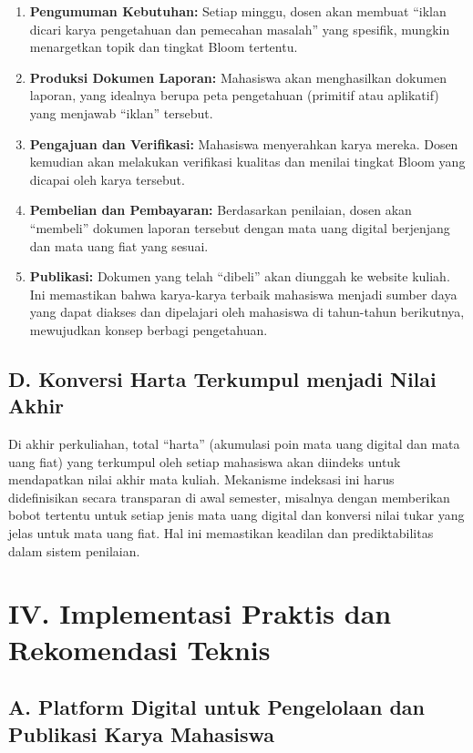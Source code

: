 \documentclass[
  letterpaper,
  DIV=11,
  numbers=noendperiod]{scrreprt}
\begin{document}
\begin{enumerate}
\def\labelenumi{\arabic{enumi}.}
\item
  \textbf{Pengumuman Kebutuhan:} Setiap minggu, dosen akan membuat
  ``iklan dicari karya pengetahuan dan pemecahan masalah'' yang
  spesifik, mungkin menargetkan topik dan tingkat Bloom tertentu.
\item
  \textbf{Produksi Dokumen Laporan:} Mahasiswa akan menghasilkan dokumen
  laporan, yang idealnya berupa peta pengetahuan (primitif atau
  aplikatif) yang menjawab ``iklan'' tersebut.
\item
  \textbf{Pengajuan dan Verifikasi:} Mahasiswa menyerahkan karya mereka.
  Dosen kemudian akan melakukan verifikasi kualitas dan menilai tingkat
  Bloom yang dicapai oleh karya tersebut.
\item
  \textbf{Pembelian dan Pembayaran:} Berdasarkan penilaian, dosen akan
  ``membeli'' dokumen laporan tersebut dengan mata uang digital
  berjenjang dan mata uang fiat yang sesuai.
\item
  \textbf{Publikasi:} Dokumen yang telah ``dibeli'' akan diunggah ke
  website kuliah. Ini memastikan bahwa karya-karya terbaik mahasiswa
  menjadi sumber daya yang dapat diakses dan dipelajari oleh mahasiswa
  di tahun-tahun berikutnya, mewujudkan konsep berbagi pengetahuan.
\end{enumerate}

\subsection{D. Konversi Harta Terkumpul menjadi Nilai
Akhir}\label{d.-konversi-harta-terkumpul-menjadi-nilai-akhir}

Di akhir perkuliahan, total ``harta'' (akumulasi poin mata uang digital
dan mata uang fiat) yang terkumpul oleh setiap mahasiswa akan diindeks
untuk mendapatkan nilai akhir mata kuliah. Mekanisme indeksasi ini harus
didefinisikan secara transparan di awal semester, misalnya dengan
memberikan bobot tertentu untuk setiap jenis mata uang digital dan
konversi nilai tukar yang jelas untuk mata uang fiat. Hal ini memastikan
keadilan dan prediktabilitas dalam sistem penilaian.

\section{IV. Implementasi Praktis dan Rekomendasi
Teknis}\label{iv.-implementasi-praktis-dan-rekomendasi-teknis}

\subsection{A. Platform Digital untuk Pengelolaan dan Publikasi Karya
Mahasiswa}\label{a.-platform-digital-untuk-pengelolaan-dan-publikasi-karya-mahasiswa}
\end{document}
